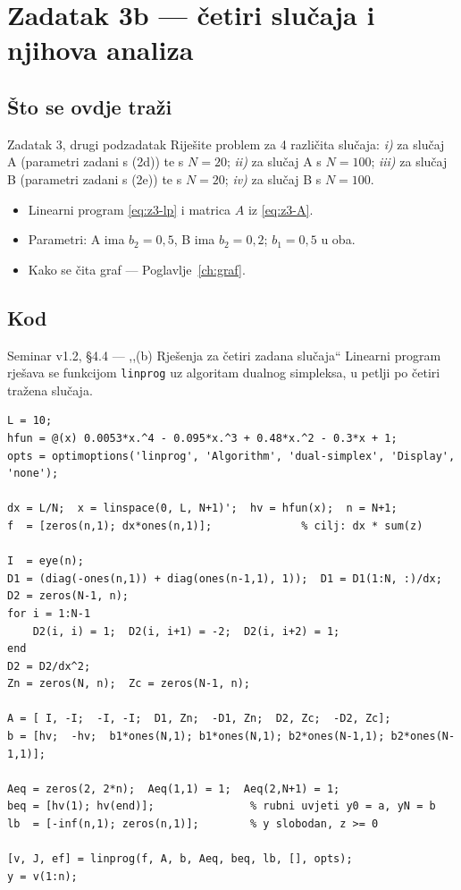 \chapter{Zadatak 3b --- četiri slučaja i njihova analiza}
\label{ch:z3-rjesenja}

\section{Što se ovdje traži}

\begin{zadatak}{Zadatak 3, drugi podzadatak}
Riješite problem za 4 različita slučaja: \emph{i)} za slučaj A (parametri zadani
s (2d)) te s $N = 20$; \emph{ii)} za slučaj A s $N = 100$; \emph{iii)} za slučaj B
(parametri zadani s (2e)) te s $N = 20$; \emph{iv)} za slučaj B s $N = 100$.
\end{zadatak}

\begin{predznanje}
\begin{itemize}[nosep,leftmargin=*]
  \item Linearni program \eqref{eq:z3-lp} i matrica $A$ iz \eqref{eq:z3-A}.
  \item Parametri: A ima $b_2 = 0{,}5$, B ima $b_2 = 0{,}2$; $b_1 = 0{,}5$ u oba.
  \item Kako se čita graf --- Poglavlje~\ref{ch:graf}.
\end{itemize}
\end{predznanje}

\section{Kod}
\label{sec:z3-kod}

\begin{seminar}{Seminar v1.2, §4.4 --- ,,(b) Rješenja za četiri zadana slučaja``}
Linearni program rješava se funkcijom \texttt{linprog} uz algoritam dualnog
simpleksa, u petlji po četiri tražena slučaja.

\begin{lstlisting}[style=matlabstyle]
L = 10;
hfun = @(x) 0.0053*x.^4 - 0.095*x.^3 + 0.48*x.^2 - 0.3*x + 1;
opts = optimoptions('linprog', 'Algorithm', 'dual-simplex', 'Display', 'none');

dx = L/N;  x = linspace(0, L, N+1)';  hv = hfun(x);  n = N+1;
f  = [zeros(n,1); dx*ones(n,1)];              % cilj: dx * sum(z)

I  = eye(n);
D1 = (diag(-ones(n,1)) + diag(ones(n-1,1), 1));  D1 = D1(1:N, :)/dx;
D2 = zeros(N-1, n);
for i = 1:N-1
    D2(i, i) = 1;  D2(i, i+1) = -2;  D2(i, i+2) = 1;
end
D2 = D2/dx^2;
Zn = zeros(N, n);  Zc = zeros(N-1, n);

A = [ I, -I;  -I, -I;  D1, Zn;  -D1, Zn;  D2, Zc;  -D2, Zc];
b = [hv;  -hv;  b1*ones(N,1); b1*ones(N,1); b2*ones(N-1,1); b2*ones(N-1,1)];

Aeq = zeros(2, 2*n);  Aeq(1,1) = 1;  Aeq(2,N+1) = 1;
beq = [hv(1); hv(end)];               % rubni uvjeti y0 = a, yN = b
lb  = [-inf(n,1); zeros(n,1)];        % y slobodan, z >= 0

[v, J, ef] = linprog(f, A, b, Aeq, beq, lb, [], opts);
y = v(1:n);
\end{lstlisting}
\end{seminar}

